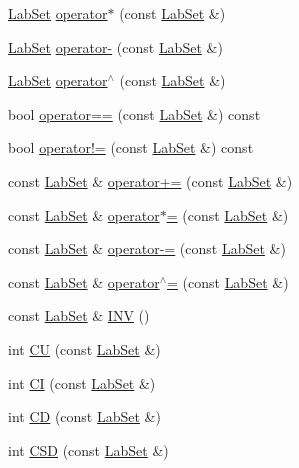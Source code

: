 \begin{DoxyCompactItemize}
\hyperlink{classelps_1_1_lab_set}{Lab\+Set} \hyperlink{classelps_1_1_lab_set_aa74738d4f3a2fb964d5c804e5bd1c925}{operator$\ast$} (const \hyperlink{classelps_1_1_lab_set}{Lab\+Set} \&)
\item 
\hyperlink{classelps_1_1_lab_set}{Lab\+Set} \hyperlink{classelps_1_1_lab_set_af791e0fa94027af52128687645b14e0b}{operator-\/} (const \hyperlink{classelps_1_1_lab_set}{Lab\+Set} \&)
\item 
\hyperlink{classelps_1_1_lab_set}{Lab\+Set} \hyperlink{classelps_1_1_lab_set_a1757181a1963556912c4688248f577f4}{operator$^\wedge$} (const \hyperlink{classelps_1_1_lab_set}{Lab\+Set} \&)
\item 
bool \hyperlink{classelps_1_1_lab_set_a5d6358ff95fba2d5d31f0f6e823d3be6}{operator==} (const \hyperlink{classelps_1_1_lab_set}{Lab\+Set} \&) const 
\item 
bool \hyperlink{classelps_1_1_lab_set_a1260e8e10d93c6b0edfc1e2dff5b4703}{operator!=} (const \hyperlink{classelps_1_1_lab_set}{Lab\+Set} \&) const 
\item 
const \hyperlink{classelps_1_1_lab_set}{Lab\+Set} \& \hyperlink{classelps_1_1_lab_set_acd76c9fad0be84ce644c094f5fb41856}{operator+=} (const \hyperlink{classelps_1_1_lab_set}{Lab\+Set} \&)
\item 
const \hyperlink{classelps_1_1_lab_set}{Lab\+Set} \& \hyperlink{classelps_1_1_lab_set_a0bb79c1aeaccb020c7ef16989ed4a2f4}{operator$\ast$=} (const \hyperlink{classelps_1_1_lab_set}{Lab\+Set} \&)
\item 
const \hyperlink{classelps_1_1_lab_set}{Lab\+Set} \& \hyperlink{classelps_1_1_lab_set_a051fc5c21e70c9ea4f648583f4ffa169}{operator-\/=} (const \hyperlink{classelps_1_1_lab_set}{Lab\+Set} \&)
\item 
const \hyperlink{classelps_1_1_lab_set}{Lab\+Set} \& \hyperlink{classelps_1_1_lab_set_ab9db2366b16c31c42266f75761ac3007}{operator$^\wedge$=} (const \hyperlink{classelps_1_1_lab_set}{Lab\+Set} \&)
\item 
const \hyperlink{classelps_1_1_lab_set}{Lab\+Set} \& \hyperlink{classelps_1_1_lab_set_ac69ae589c53b9fdd67b329c5f305e853}{I\+N\+V} ()
\item 
int \hyperlink{classelps_1_1_lab_set_a26f60ba3381b8b36b09bb00bef3eb5fd}{C\+U} (const \hyperlink{classelps_1_1_lab_set}{Lab\+Set} \&)
\item 
int \hyperlink{classelps_1_1_lab_set_a57027020ec7bde56f290f3ebb3f8a574}{C\+I} (const \hyperlink{classelps_1_1_lab_set}{Lab\+Set} \&)
\item 
int \hyperlink{classelps_1_1_lab_set_ad3c28310897ff2253ca8b7290ca08945}{C\+D} (const \hyperlink{classelps_1_1_lab_set}{Lab\+Set} \&)
\item 
int \hyperlink{classelps_1_1_lab_set_a006924c3a5c14df8b04831aae9ee1e1a}{C\+S\+D} (const \hyperlink{classelps_1_1_lab_set}{Lab\+Set} \&)
\end{DoxyCompactItemize}


